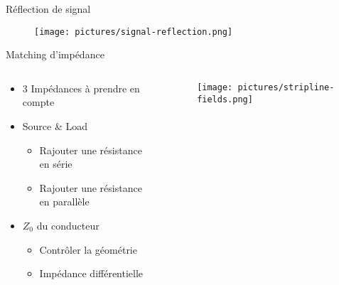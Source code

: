 \begin{frame}{Réflection de signal}
    \begin{figure}
        \centering
        \texttt{[image: pictures/signal-reflection.png]}
    \end{figure}
\end{frame}

\begin{frame}{Matching d'impédance}

    \begin{columns}
        \begin{column}{0.66\textwidth}
            \begin{itemize}
                \item 3 Impédances à prendre en compte
                \item Source \& Load
                \begin{itemize}
                    \item Rajouter une résistance en série
                    \item Rajouter une résistance en parallèle
                \end{itemize}
                \item $Z_0$ du conducteur
                \begin{itemize}
                    \item Contrôler la géométrie
                    \item Impédance différentielle 
                \end{itemize}
            \end{itemize}
        \end{column}
        \begin{column}{0.33\textwidth}
            \begin{figure}
                \centering
                \texttt{[image: pictures/stripline-fields.png]}
            \end{figure}
        \end{column}
    \end{columns}

    \vspace{-8pt}


\end{frame}
